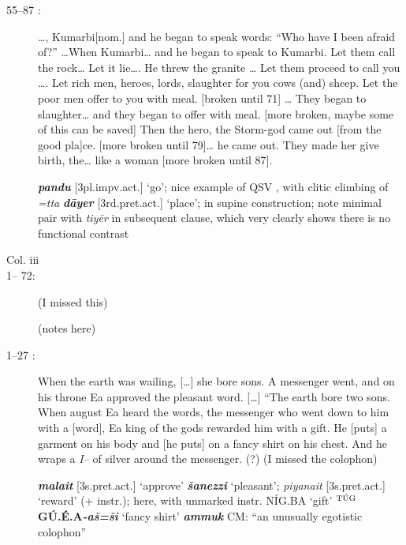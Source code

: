 \documentclass[10pt]{article}
\newcommand{\supersc}[1]{$^{\textrm{\scriptsize{#1}}}$}  	%
\newcommand{\bit}[1]{\textbf{\textit{#1}}}				%
\newcommand{\p}[1]{{\tiny[{#1}]}}					%
\renewcommand{\.}[1]{\textsubdot{#1}}
\begin{document}
\begin{description}
\begin{notes}
\end{notes}

\item[55--87 :] {\ldots}, Kumarbi\p{nom.} and he began to speak words: ``Who have I been afraid of?'' {\ldots}When Kumarbi{\ldots} and he began to speak to Kumarbi. Let them call the rock{\ldots} Let it lie{\ldots}. He threw the granite {\ldots} Let them proceed to call you {\ldots}. Let rich men, heroes, lords, slaughter for you cows (and) sheep. Let the poor men offer to you with meal. [broken until 71] {\ldots} They began to slaughter{\ldots} and they began to offer with meal. [more broken, maybe some of this can be saved] Then the hero, the Storm-god came out [from the good pla]ce. [more broken until 79]{\ldots} he came out. They made her give birth, the{\ldots} like a woman [more broken until 87].

\begin{notes}

\bit{pandu} \p{3pl.impv.act.} `go'; nice example of QSV , with clitic climbing of \textit{=tta} \bit{d\=ayer} \p{3rd.pret.act.} `place'; in supine construction; note minimal pair with \textit{tiy\=er} in subsequent clause, which very clearly shows there is no functional contrast

\end{notes}

\bigskip
\item[Col. iii]
\bigskip

\item[1-- 72:] (I missed this) 


\begin{notes}

(notes here)

\end{notes}



\item[1--27 :] When the earth was wailing, [{\ldots}] she bore sons. A messenger went, and on his throne Ea approved the pleasant word. [{\ldots}] ``The earth bore two sons. When august Ea heard the words, the messenger who went down to him with a [word], Ea king of the gods rewarded him with a gift. He [puts] a garment on his body and [he puts] on a fancy shirt on his chest. And he wraps a \textit{I--} of silver around the messenger. (?) (I missed the colophon)


\begin{notes}

\bit{malait} \p{3s.pret.act.} `approve' \bit{\v{sa}nezzi} `pleasant'; \textit{piyanait} \p{3s.pret.act.} `reward' (+ instr.); here, with unmarked instr. N\'IG.BA `gift' \textbf{\supersc{T\'UG}G\'U.\'E.A}\bit{-a\v{s}=\v{s}i} `fancy shirt' \bit{ammuk} CM: ``an unusually egotistic colophon''

\end{notes}

\end{description}
\end{document}
